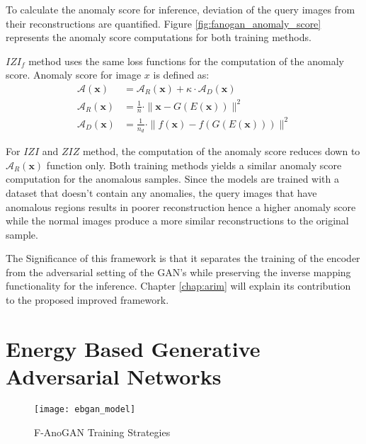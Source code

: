 To calculate the anomaly score for inference, deviation of the query images from their
reconstructions are quantified. Figure \ref{fig:fanogan_anomaly_score} represents the anomaly score
computations for both training methods.

 $IZI_f$ method uses the same loss functions for the computation of the anomaly score. Anomaly score
 for image $x$ is defined as:
\begin{align}
	\mathcal{A}(\mathbf{x})&=\mathcal{A}_{R}(\mathbf{x})+\kappa \cdot \mathcal{A}_{D}(\mathbf{x}) \\[5pt]
	\mathcal{A}_{R}(\mathbf{x})&=\frac{1}{n} \cdot\|\mathbf{x}-G(E(\mathbf{x}))\|^{2} \\[5pt]
	\mathcal{A}_{D}(\mathbf{x})&=\frac{1}{n_{d}} \cdot\|f(\mathbf{x})-f(G(E(\mathbf{x})))\|^{2}
\end{align}

For $IZI$ and $ZIZ$ method, the computation of the anomaly score reduces down to
$\mathcal{A}_{R}(\mathbf{x})$ function only. Both training methods yields a similar anomaly score
computation for the anomalous samples. Since the models are trained with a dataset that doesn't
contain any anomalies, the query images that have anomalous regions results in poorer reconstruction
hence a higher anomaly score while the normal images produce a more similar reconstructions to the
original sample. 

The Significance of this framework is that it separates the training of the encoder from the
adversarial setting of the GAN's while preserving the inverse mapping functionality for the
inference. Chapter \ref{chap:arim} will explain its contribution to the proposed improved framework.

\section{Energy Based Generative Adversarial Networks}
\label{sec:ebgan}



\begin{figure}[h!]
	\centering
	\texttt{[image: ebgan\_model]}
	\caption{F-AnoGAN Training Strategies \cite{Zhao2016EnergybasedGA}}
	\label{fig:ebgan_model}
\end{figure}

\endgroup
